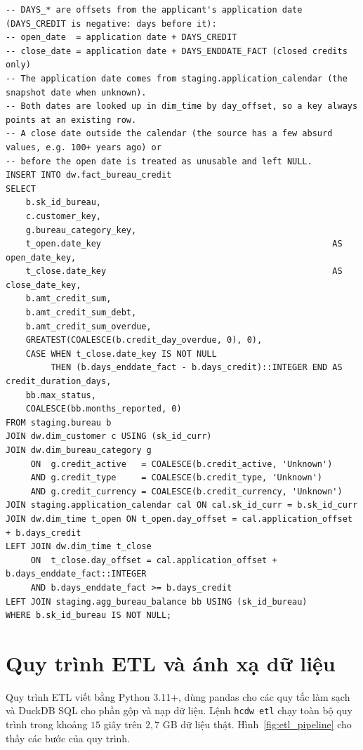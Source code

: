\begin{listing}[H]
	\footnotesize
	\begin{verbatim}
-- DAYS_* are offsets from the applicant's application date (DAYS_CREDIT is negative: days before it):
-- open_date  = application date + DAYS_CREDIT
-- close_date = application date + DAYS_ENDDATE_FACT (closed credits only)
-- The application date comes from staging.application_calendar (the snapshot date when unknown).
-- Both dates are looked up in dim_time by day_offset, so a key always points at an existing row.
-- A close date outside the calendar (the source has a few absurd values, e.g. 100+ years ago) or
-- before the open date is treated as unusable and left NULL.
INSERT INTO dw.fact_bureau_credit
SELECT
    b.sk_id_bureau,
    c.customer_key,
    g.bureau_category_key,
    t_open.date_key                                              AS open_date_key,
    t_close.date_key                                             AS close_date_key,
    b.amt_credit_sum,
    b.amt_credit_sum_debt,
    b.amt_credit_sum_overdue,
    GREATEST(COALESCE(b.credit_day_overdue, 0), 0),
    CASE WHEN t_close.date_key IS NOT NULL
         THEN (b.days_enddate_fact - b.days_credit)::INTEGER END AS credit_duration_days,
    bb.max_status,
    COALESCE(bb.months_reported, 0)
FROM staging.bureau b
JOIN dw.dim_customer c USING (sk_id_curr)
JOIN dw.dim_bureau_category g
     ON  g.credit_active   = COALESCE(b.credit_active, 'Unknown')
     AND g.credit_type     = COALESCE(b.credit_type, 'Unknown')
     AND g.credit_currency = COALESCE(b.credit_currency, 'Unknown')
JOIN staging.application_calendar cal ON cal.sk_id_curr = b.sk_id_curr
JOIN dw.dim_time t_open ON t_open.day_offset = cal.application_offset + b.days_credit
LEFT JOIN dw.dim_time t_close
     ON  t_close.day_offset = cal.application_offset + b.days_enddate_fact::INTEGER
     AND b.days_enddate_fact >= b.days_credit
LEFT JOIN staging.agg_bureau_balance bb USING (sk_id_bureau)
WHERE b.sk_id_bureau IS NOT NULL;
\end{verbatim}
	\caption{Truy vấn nạp bảng \texttt{fact\_bureau\_credit}}
	\label{sql:fact_bureau_credit}
\end{listing}

\section{Quy trình ETL và ánh xạ dữ liệu}
\label{sec:etl}
Quy trình ETL viết bằng Python 3.11+, dùng pandas cho các quy tắc làm sạch và DuckDB SQL cho phần gộp và nạp dữ liệu. Lệnh \texttt{hcdw etl} chạy toàn bộ quy trình trong khoảng $15$ giây trên $2{,}7$ GB dữ liệu thật. Hình~\ref{fig:etl_pipeline} cho thấy các bước của quy trình.

